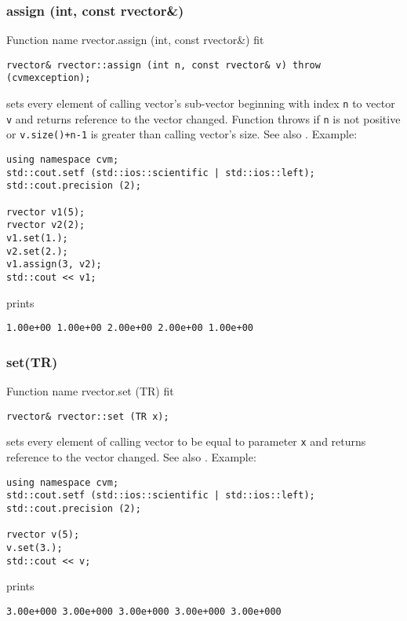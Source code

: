 \subsubsection{assign (int, const rvector\&)}
Function%
\pdfdest name {rvector.assign (int, const rvector&)} fit
\begin{verbatim}
rvector& rvector::assign (int n, const rvector& v) throw (cvmexception);
\end{verbatim}
sets every element of calling vector's sub-vector
beginning with \Based index \verb"n" to vector \verb"v"
and returns  reference to the vector changed.
Function throws  
if \verb"n" is not positive or \verb"v.size()+n-1" is greater than
calling vector's size.
See also .
Example:
\begin{Verbatim}
using namespace cvm;
std::cout.setf (std::ios::scientific | std::ios::left); 
std::cout.precision (2);

rvector v1(5);
rvector v2(2);
v1.set(1.);
v2.set(2.);
v1.assign(3, v2);
std::cout << v1;
\end{Verbatim}
prints
\begin{Verbatim}
1.00e+00 1.00e+00 2.00e+00 2.00e+00 1.00e+00
\end{Verbatim}
\newpage


\subsubsection{set(TR)}
Function%
\pdfdest name {rvector.set (TR)} fit
\begin{verbatim}
rvector& rvector::set (TR x);
\end{verbatim}
sets every element of calling vector to be equal to
parameter \verb"x"
and returns  reference to the vector changed.
See also .
Example:
\begin{Verbatim}
using namespace cvm;
std::cout.setf (std::ios::scientific | std::ios::left); 
std::cout.precision (2);

rvector v(5);
v.set(3.);
std::cout << v;
\end{Verbatim}
prints
\begin{Verbatim}
3.00e+000 3.00e+000 3.00e+000 3.00e+000 3.00e+000
\end{Verbatim}
\newpage



